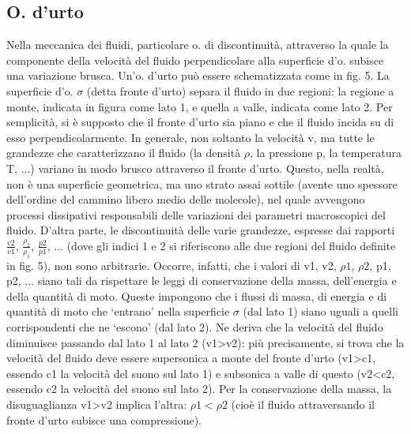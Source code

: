 \documentclass[a4paper]{article}
\begin{document}
\subsection{O. d'urto}
Nella meccanica dei fluidi, particolare o. di discontinuità, attraverso la quale la componente della velocità del fluido perpendicolare alla superficie d'o. subisce una variazione brusca. Un'o. d'urto può essere schematizzata come in fig. 5. La superficie d'o. $\sigma$ (detta fronte d'urto) separa il fluido in due regioni: la regione a monte, indicata in figura come lato 1, e quella a valle, indicata come lato 2. Per semplicità, si è supposto che il fronte d'urto sia piano e che il fluido incida su di esso perpendicolarmente. 
In generale, non soltanto la velocità v, ma tutte le grandezze che caratterizzano il fluido (la densità $\rho$, la pressione p, la temperatura T, ...) variano in modo brusco attraverso il fronte d'urto. Questo, nella realtà, non è una superficie geometrica, ma uno strato assai sottile (avente uno spessore dell'ordine del cammino libero medio delle molecole), nel quale avvengono processi dissipativi responsabili delle variazioni dei parametri macroscopici del fluido. 
D'altra parte, le discontinuità delle varie grandezze, espresse dai rapporti $\frac{v2}{v1}$, $\frac{\rho_2}{\rho_1}$, $\frac{p2}{p1}$, ... (dove gli indici 1 e 2 si riferiscono alle due regioni del fluido definite in fig. 5), non sono arbitrarie. Occorre, infatti, che i valori di v1, v2, $\rho1$, $\rho2$, p1, p2, ... siano tali da rispettare le leggi di conservazione della massa, dell'energia e della quantità di moto. 
Queste impongono che i flussi di massa, di energia e di quantità di moto che ‘entrano' nella superficie $\sigma$ (dal lato 1) siano uguali a quelli corrispondenti che ne ‘escono' (dal lato 2). Ne deriva che la velocità del fluido diminuisce passando dal lato 1 al lato 2 (v1>v2): più precisamente, si trova che la velocità del fluido deve essere supersonica a monte del fronte d'urto (v1>c1, essendo c1 la velocità del suono sul lato 1) e subsonica a valle di questo (v2<c2, essendo c2 la velocità del suono sul lato 2). Per la conservazione della massa, la disuguaglianza v1>v2 implica l'altra: $\rho1<\rho2$ (cioè il fluido attraversando il fronte d'urto subisce una compressione).
\end{document}
